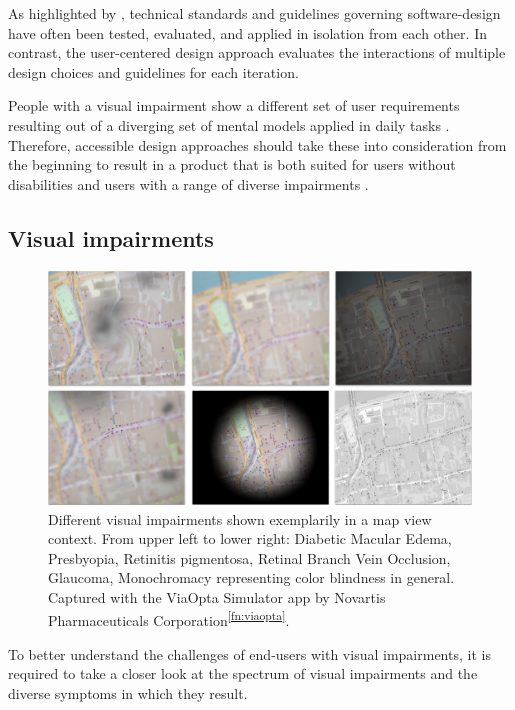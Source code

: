 \documentclass[agile, final]{copernicus-agile}
\begin{document}
As highlighted by \citet{ChammasEA2015}, technical standards and guidelines governing software-design have often been tested, evaluated, and applied in isolation from each other. In contrast, the user-centered design approach evaluates the interactions of multiple design choices and guidelines for each iteration. 

People with a visual impairment show a different set of user requirements resulting out of a diverging set of mental models applied in daily tasks \citep{Sanchez2008}. Therefore, accessible design approaches should take these into consideration from the beginning to result in a product that is both suited for users without disabilities and users with a range of diverse impairments \citep{RastovacEA2018}. 

\subsection{Visual impairments}

\begin{figure}[t]
  \includegraphics[width=\textwidth]{figures/visual impairments.png}
\caption{Different visual impairments shown exemplarily in a map view context. From upper left to lower right: Diabetic Macular Edema, Presbyopia, Retinitis pigmentosa, Retinal Branch Vein Occlusion, Glaucoma, Monochromacy representing color blindness in general. Captured with the ViaOpta Simulator app by Novartis Pharmaceuticals Corporation\textsuperscript{\ref{fn:viaopta}}.}
\label{pic:visual_impairments}
\end{figure}

To better understand the challenges of end-users with visual impairments, it is required to take a closer look at the spectrum of visual impairments and the diverse symptoms in which they result.
\end{document}
